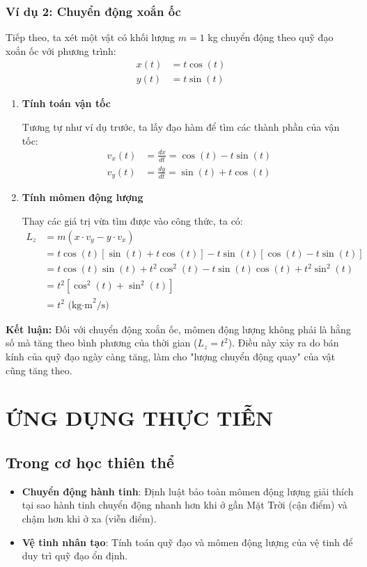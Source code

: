 \documentclass{report}
\begin{document}
\subsection{Ví dụ 2: Chuyển động xoắn ốc}
\justifying Tiếp theo, ta xét một vật có khối lượng $m = 1$ kg chuyển động theo quỹ đạo xoắn ốc với phương trình:
\begin{align*}
x(t) &= t\cos(t)\\
y(t) &= t\sin(t)
\end{align*}
\begin{enumerate}[label=\textbf{Bước \arabic*:}, leftmargin=2cm, itemsep=5pt]
    \item \textbf{Tính toán vận tốc}
    
    \justifying Tương tự như ví dụ trước, ta lấy đạo hàm để tìm các thành phần của vận tốc:
    \begin{align*}
    v_x(t) &= \frac{dx}{dt} = \cos(t) - t\sin(t)\\
    v_y(t) &= \frac{dy}{dt} = \sin(t) + t\cos(t)
    \end{align*}

    \item \textbf{Tính mômen động lượng}
    
    \justifying Thay các giá trị vừa tìm được vào công thức, ta có:
    \begin{align*}
    L_z &= m(x \cdot v_y - y \cdot v_x)\\
    &= t\cos(t)[\sin(t) + t\cos(t)] - t\sin(t)[\cos(t) - t\sin(t)]\\
    &= t\cos(t)\sin(t) + t^2\cos^2(t) - t\sin(t)\cos(t) + t^2\sin^2(t)\\
    &= t^2[\cos^2(t) + \sin^2(t)]\\
    &= t^2 \text{ (kg·m}^2\text{/s)}
    \end{align*}
\end{enumerate}
\textbf{Kết luận:} \justifying Đối với chuyển động xoắn ốc, mômen động lượng không phải là hằng số mà tăng theo bình phương của thời gian ($L_z = t^2$). Điều này xảy ra do bán kính của quỹ đạo ngày càng tăng, làm cho "lượng chuyển động quay" của vật cũng tăng theo.


\chapter{ỨNG DỤNG THỰC TIỄN}

\section{Trong cơ học thiên thể}
\begin{itemize}
    \item \justifying \textbf{Chuyển động hành tinh}: Định luật bảo toàn mômen động lượng giải thích tại sao hành tinh chuyển động nhanh hơn khi ở gần Mặt Trời (cận điểm) và chậm hơn khi ở xa (viễn điểm).
    \item \justifying \textbf{Vệ tinh nhân tạo}: Tính toán quỹ đạo và mômen động lượng của vệ tinh để duy trì quỹ đạo ổn định.
\end{itemize}
\end{document}
